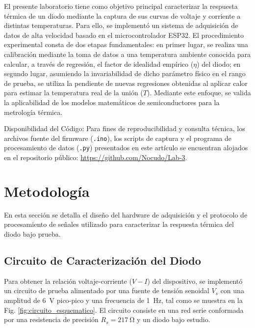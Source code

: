 \documentclass[conference]{IEEEtran}
\begin{document}
El presente laboratorio tiene como objetivo principal caracterizar la respuesta térmica de un diodo mediante la captura de sus curvas de voltaje y corriente a distintas temperaturas. Para ello, se implementó un sistema de adquisición de datos de alta velocidad basado en el microcontrolador ESP32. El procedimiento experimental consta de dos etapas fundamentales: en primer lugar, se realiza una calibración mediante la toma de datos a una temperatura ambiente conocida para calcular, a través de regresión, el factor de idealidad empírico ($\eta$) del diodo; en segundo lugar, asumiendo la invariabilidad de dicho parámetro físico en el rango de prueba, se utiliza la pendiente de nuevas regresiones obtenidas al aplicar calor para estimar la temperatura real de la unión ($T$). Mediante este enfoque, se valida la aplicabilidad de los modelos matemáticos de semiconductores para la metrología térmica.

\vspace{3mm}
\noindent Disponibilidad del Código: Para fines de reproducibilidad y consulta técnica, los archivos fuente del firmware (\texttt{.ino}), los scripts de captura y el programa de procesamiento de datos (\texttt{.py}) presentados en este artículo se encuentran alojados en el repositorio público: \url{https://github.com/Nocudo/Lab-3}.
\vspace{3mm}

\section{Metodología}
\label{sec:metodologia}

En esta sección se detalla el diseño del hardware de adquisición y el protocolo de procesamiento de señales utilizado para caracterizar la respuesta térmica del diodo bajo prueba.

\subsection{Circuito de Caracterización del Diodo}
\label{subsec:circuito_diodo}

Para obtener la relación voltaje-corriente ($V-I$) del dispositivo, se implementó un circuito de prueba alimentado por una fuente de tensión senoidal $V_s$ con una amplitud de \SI{6}{\volt} pico-pico y una frecuencia de \SI{1}{\hertz}, tal como se muestra en la Fig. \ref{fig:circuito_esquematico}. El circuito consiste en una red serie conformada por una resistencia de precisión $R_s = \SI{217}{\ohm}$ y un diodo bajo estudio.
\end{document}
